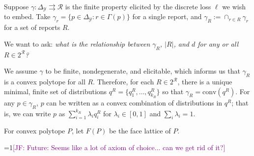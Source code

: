 \documentclass[12pt]{article}
\newcommand{\Comments}{1}
\newcommand{\mynote}[2]{\ifnum\Comments=1\textcolor{#1}{#2}\fi}
\newcommand{\jessie}[1]{\mynote{purple}{[JF: #1]}}
\newcommand{\simplex}{\Delta_\Y}
\newcommand{\R}{\mathcal{R}}
\newcommand{\Y}{\mathcal{Y}}
\newcommand{\toto}{\rightrightarrows}
\newcommand{\conv}{\mathrm{conv}}
\begin{document}
Suppose $\gamma: \simplex \toto \R$ is the finite property elicited by the discrete loss $\ell$ we wish to embed.
Take $\gamma_r = \{p \in \simplex : r \in \Gamma(p) \}$ for a single report, and $\gamma_R := \cap_{r \in R} \gamma_r$ for a set of reports $R$.

\bigskip
We want to ask: \emph{what is the relationship between $\gamma_R$, $|R|$, and $d$ for any or all $R \in 2^\R$?}
\bigskip

We assume $\gamma$ to be finite, nondegenerate, and elicitable, which informs us that $\gamma_R$ is a convex polytope for all $R$.
Therefore, for each $R \in 2^\R$, there is a unique minimal, finite set of distributions $q^R = \{q^R_1, \ldots, q^R_{k_R}\}$ so that $\gamma_R = \conv(q^R)$.
For any $p \in \gamma_R$, $p$ can be written as a convex combination of distributions in $q^R$; that is, we can write $p$ as $\sum_{i=1}^{k_R}\lambda_i q^R_i$ for $\lambda_i \in [0,1]$ and $\sum_i \lambda_i = 1$.

For convex polytope $P$, let $F(P)$ be the face lattice of $P$.


\jessie{Future: Seems like a lot of axiom of choice... can we get rid of it?}
\end{document}
